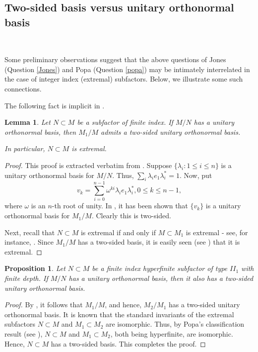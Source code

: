 \documentclass{amsart}
\newtheorem{proposition}[theorem]{Proposition}
\newtheorem{lemma}[theorem]{Lemma}
\theoremstyle{definition}
\theoremstyle{theorem}
\begin{document}
\subsection{Two-sided basis versus unitary orthonormal basis}\( \)


Some preliminary observations suggest that the above questions of
Jones (Question \ref{Jones}) and Popa (Question \ref{popa}) may be
intimately interrelated in the case of integer index (extremal)
subfactors. Below, we illustrate some such connections.


The following fact is implicit in \cite{S}.
\begin{lemma}\cite{S}\label{S}
Let $N\subset M$ be a subfactor of finite index.  If $M/N$ has a  unitary
orthonormal basis, then $M_1/M$ admits a two-sided unitary
orthonormal basis.

In particular, $N \subset M$ is extremal.
\end{lemma}
\begin{proof}
This proof is extracted verbatim from \cite{S}. Suppose $\{\lambda_i:
1 \leq i \leq n\}$ is a unitary orthonormal basis for $M/N$. Thus,
$\sum_i \lambda_ie_1\lambda^*_i=1.$ Now, put
$$
v_k=\sum_{i=0}^{n-1} {\omega}^{ki} \lambda_ie_1\lambda^*_i, 0 \leq k
\leq n-1,
$$
where $\omega$ is an $n$-th root of unity. In
\cite[Proposition 3.24]{S}, it has been shown that $\{v_k\}$ is a
unitary orthonormal basis for $M_1/M$. Clearly this is two-sided.

Next, recall that $N\subset M$ is extremal if and only if $M\subset
M_1$ is extremal - see, for instance, \cite{pop2}. Since $M_1/M$ has a two-sided basis,
it is easily seen (see \cite{BG}) that it is extremal.
\end{proof}


 
\begin{proposition}
 Let $N \subset M$ be a finite index hyperfinite subfactor of type
 $II_1$ with finite depth. If $M/N$ has a unitary orthonormal basis,
 then it also has a two-sided unitary orthonormal basis.
\end{proposition}

\begin{proof}
By , it follows that $M_1/M$, and hence, $M_2/M_1$ has a
two-sided unitary orthonormal basis.  It is known that the standard
invariants of the extremal subfactors $N \subset M$ and $M_1 \subset
M_2$ are isomorphic.  Thus, by Popa's classification result (see
\cite{pop2}), $N \subset M$ and $M_1 \subset M_2$, both being
hyperfinite, are isomorphic. Hence, $N \subset M$ has a two-sided
basis.  This completes the proof.
 \end{proof}
\end{document}
